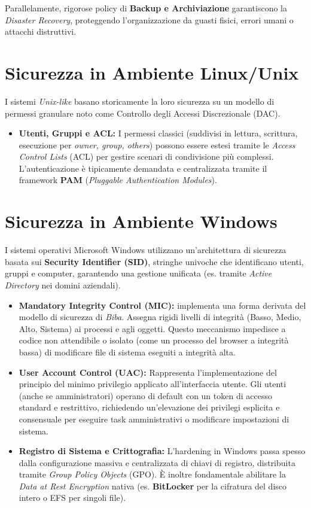 Parallelamente, rigorose policy di \textbf{Backup e Archiviazione} garantiscono la \textit{Disaster Recovery}, proteggendo l'organizzazione da guasti fisici, errori umani o attacchi distruttivi.

\section{Sicurezza in Ambiente Linux/Unix}
I sistemi \textit{Unix-like} basano storicamente la loro sicurezza su un modello di permessi granulare noto come Controllo degli Accessi Discrezionale (DAC).

\begin{itemize}
    \item \textbf{Utenti, Gruppi e ACL:} I permessi classici (suddivisi in lettura, scrittura, esecuzione per \textit{owner, group, others}) possono essere estesi tramite le \textit{Access Control Lists} (ACL) per gestire scenari di condivisione più complessi. L'autenticazione è tipicamente demandata e centralizzata tramite il framework \textbf{PAM} (\textit{Pluggable Authentication Modules}).
\end{itemize}

\section{Sicurezza in Ambiente Windows}
I sistemi operativi Microsoft Windows utilizzano un'architettura di sicurezza basata sui \textbf{Security Identifier (SID)}, stringhe univoche che identificano utenti, gruppi e computer, garantendo una gestione unificata (es. tramite \textit{Active Directory} nei domini aziendali).

\begin{itemize}
    \item \textbf{Mandatory Integrity Control (MIC):} implementa una forma derivata del modello di sicurezza di \textit{Biba}. Assegna rigidi livelli di integrità (Basso, Medio, Alto, Sistema) ai processi e agli oggetti. Questo meccanismo impedisce a codice non attendibile o isolato (come un processo del browser a integrità bassa) di modificare file di sistema eseguiti a integrità alta.
    \item \textbf{User Account Control (UAC):} Rappresenta l'implementazione del principio del minimo privilegio applicato all'interfaccia utente. Gli utenti (anche se amministratori) operano di default con un token di accesso standard e restrittivo, richiedendo un'elevazione dei privilegi esplicita e consensuale per eseguire task amministrativi o modificare impostazioni di sistema.
    \item \textbf{Registro di Sistema e Crittografia:} L'hardening in Windows passa spesso dalla configurazione massiva e centralizzata di chiavi di registro, distribuita tramite \textit{Group Policy Objects} (GPO). È inoltre fondamentale abilitare la \textit{Data at Rest Encryption} nativa (es. \textbf{BitLocker} per la cifratura del disco intero o EFS per singoli file).
\end{itemize}

